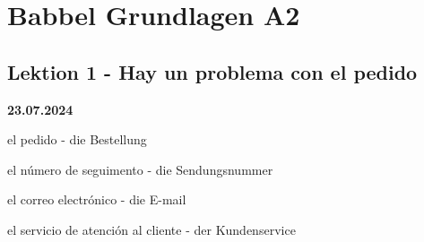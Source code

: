 \chapter{Babbel Grundlagen A2}
\section{Lektion 1 - Hay un problema con el pedido}
\textbf{23.07.2024}\\
\begin{vocabulario}
    \item el pedido - die Bestellung
    \item el n\'umero de seguimento - die Sendungsnummer
    \item el correo electr\'onico - die E-mail
    \item el servicio de atenci\'on al cliente - der Kundenservice
\end{vocabulario}